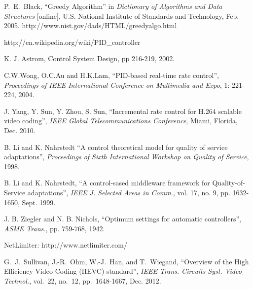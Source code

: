 \documentclass[journal]{IEEEtran}
\begin{document}
\begin{thebibliography}{1}
P.~E.~Black, ``Greedy Algorithm'' in {\em Dictionary of Algorithms and Data Structures} [online], U.S. National Institute of Standards and Technology, Feb. 2005.
\newblock http://www.nist.gov/dads/HTML/greedyalgo.html

http://en.wikipedia.org/wiki/PID\_controller

K. J. Astrom, Control System Design, pp 216-219, 2002.

C.W.Wong, O.C.Au and H.K.Lam, ``PID-based real-time rate control'', {\em Proceedings of IEEE International Conference on Multimedia and Expo}, 1: 221-224, 2004.

J. Yang, Y. Sun, Y. Zhou, S. Sun, ``Incremental rate control for H.264 scalable video coding'', {\em IEEE Global Telecommunications Conference}, Miami, Florida, Dec. 2010.

B. Li and K. Nahrstedt  ``A control theoretical model for quality of service adaptations'', {\em Proceedings of Sixth International Workshop on Quality of Service}, 1998.

B. Li and K. Nahrstedt, ``A control-sased middleware framework for Quality-of-Service adaptations'', {\em IEEE J. Selected Areas in Comm.}, vol. 17, no. 9, pp. 1632-1650, Sept. 1999.

J. B. Ziegler and N. B. Nichols, ``Optimum settings for automatic controllers'', {\em ASME Trans.}, pp. 759-768, 1942.

NetLimiter: http://www.netlimiter.com/

G.~J.~Sullivan, J.-R.~Ohm, W.-J.~Han, and T.~Wiegand, ``Overview of the High Efficiency Video Coding (HEVC) standard'', {\em IEEE Trans. Circuits Syst. Video Technol.}, vol.~22, no.~12, pp.~1648-1667, Dec. 2012. 

\end{thebibliography}

\balance

\end{document}
